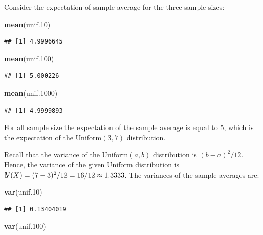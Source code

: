 \documentclass[]{krantz}
\makeatletter
\newenvironment{Shaded}{\begin{snugshade}}{\end{snugshade}}
\newcommand{\KeywordTok}[1]{\textcolor[rgb]{0.13,0.29,0.53}{\textbf{#1}}}
\newcommand{\DecValTok}[1]{\textcolor[rgb]{0.00,0.00,0.81}{#1}}
\newcommand{\NormalTok}[1]{#1}
\newcommand{\Var}{{\rm I\kern-.3em V}}
\newenvironment{kframe}{%
\medskip{}
\setlength{\fboxsep}{.8em}
 \def\at@end@of@kframe{}%
 \ifinner\ifhmode%
  \def\at@end@of@kframe{\end{minipage}}%
  \begin{minipage}{\columnwidth}%
 \fi\fi%
 \def\FrameCommand##1{\hskip\@totalleftmargin \hskip-\fboxsep
 \colorbox{shadecolor}{##1}\hskip-\fboxsep
     \hskip-\linewidth \hskip-\@totalleftmargin \hskip\columnwidth}%
 \MakeFramed {\advance\hsize-\width
   \@totalleftmargin\z@ \linewidth\hsize
   \@setminipage}}%
 {\par\unskip\endMakeFramed%
 \at@end@of@kframe}
\renewenvironment{Shaded}{\begin{kframe}}{\end{kframe}}
\theoremstyle{definition}
\theoremstyle{definition}
\theoremstyle{definition}
\theoremstyle{remark}
\makeatother
\begin{document}
Consider the expectation of sample average for the three sample sizes:

\begin{Shaded}
\begin{Highlighting}[]
\KeywordTok{mean}\NormalTok{(unif.}\DecValTok{10}\NormalTok{)}
\end{Highlighting}
\end{Shaded}

\begin{verbatim}
## [1] 4.9996645
\end{verbatim}

\begin{Shaded}
\begin{Highlighting}[]
\KeywordTok{mean}\NormalTok{(unif.}\DecValTok{100}\NormalTok{)}
\end{Highlighting}
\end{Shaded}

\begin{verbatim}
## [1] 5.000226
\end{verbatim}

\begin{Shaded}
\begin{Highlighting}[]
\KeywordTok{mean}\NormalTok{(unif.}\DecValTok{1000}\NormalTok{)}
\end{Highlighting}
\end{Shaded}

\begin{verbatim}
## [1] 4.9999893
\end{verbatim}

For all sample size the expectation of the sample average is equal to 5,
which is the expectation of the \(\mathrm{Uniform}(3,7)\) distribution.

Recall that the variance of the \(\mathrm{Uniform}(a,b)\) distribution
is \((b-a)^2/12\). Hence, the variance of the given Uniform distribution
is \(\Var(X) = (7-3)^2/12 = 16/12 \approx 1.3333\). The variances of the
sample averages are:

\begin{Shaded}
\begin{Highlighting}[]
\KeywordTok{var}\NormalTok{(unif.}\DecValTok{10}\NormalTok{)}
\end{Highlighting}
\end{Shaded}

\begin{verbatim}
## [1] 0.13404019
\end{verbatim}

\begin{Shaded}
\begin{Highlighting}[]
\KeywordTok{var}\NormalTok{(unif.}\DecValTok{100}\NormalTok{)}
\end{Highlighting}
\end{Shaded}
\end{document}
